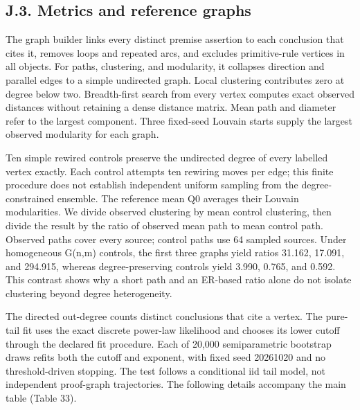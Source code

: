 \documentclass[pdflatex,sn-basic,Numbered]{sn-jnl}
\begin{document}
\subsection*{J.3. Metrics and reference graphs}\label{j.3.-metrics-and-reference-graphs}

The graph builder links every distinct premise assertion to each conclusion that cites it, removes loops and repeated arcs, and excludes primitive-rule vertices in all objects. For paths, clustering, and modularity, it collapses direction and parallel edges to a simple undirected graph. Local clustering contributes zero at degree below two. Breadth-first search from every vertex computes exact observed distances without retaining a dense distance matrix. Mean path and diameter refer to the largest component. Three fixed-seed Louvain starts supply the largest observed modularity for each graph.

Ten simple rewired controls preserve the undirected degree of every labelled vertex exactly. Each control attempts ten rewiring moves per edge; this finite procedure does not establish independent uniform sampling from the degree-constrained ensemble. The reference mean Q0 averages their Louvain modularities. We divide observed clustering by mean control clustering, then divide the result by the ratio of observed mean path to mean control path. Observed paths cover every source; control paths use 64 sampled sources. Under homogeneous G(n,m) controls, the first three graphs yield ratios 31.162, 17.091, and 294.915, whereas degree-preserving controls yield 3.990, 0.765, and 0.592. This contrast shows why a short path and an ER-based ratio alone do not isolate clustering beyond degree heterogeneity.

The directed out-degree counts distinct conclusions that cite a vertex. The pure-tail fit uses the exact discrete power-law likelihood and chooses its lower cutoff through the declared fit procedure. Each of 20,000 semiparametric bootstrap draws refits both the cutoff and exponent, with fixed seed 20261020 and no threshold-driven stopping. The test follows a conditional iid tail model, not independent proof-graph trajectories. The following details accompany the main table (Table 33).

\begingroup
\small
\setlength{\tabcolsep}{3pt}
\renewcommand{\arraystretch}{1.13}
\end{document}
